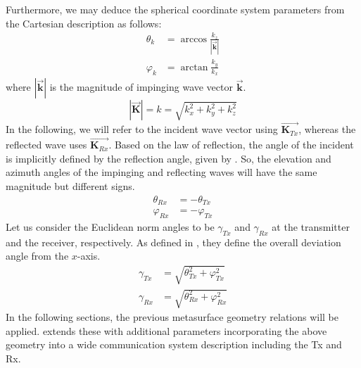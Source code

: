 Furthermore, we may deduce the spherical coordinate system parameters from the Cartesian description as follows:
\begin{equation} \label{Eq:theta_inc and varphi_inc}
	\begin{split}
		\theta_{k} &= \arccos{\frac{k_z}{|\overrightarrow{\textbf{k}}|}} \\
		\varphi_{k} &= \arctan{\frac{k_y}{k_x}} 
	\end{split}
\end{equation}
where $|\overrightarrow{\textbf{k}}|$ is the magnitude of impinging wave vector $\overrightarrow{\textbf{k}}$.
\begin{equation}
	|\overrightarrow{\textbf{K}}|= k= \sqrt{k_x^2+ k_y^2+ k_z^2}
\end{equation}
In the following, we will refer to the incident  wave vector using $\overrightarrow{\textbf{K}_{Tx}}$, whereas the reflected wave uses $\overrightarrow{\textbf{K}_{Rx}}$. Based on the law of reflection, the angle of the incident is implicitly defined by the reflection angle, given by . So, the elevation and azimuth angles of the impinging and reflecting waves will have the same magnitude but different signs.
\begin{equation} \label{Eq:law of reflection}
	\begin{split}
		\theta_{Rx} &= -\theta_{Tx}\\
		\varphi_{Rx} &=  -\varphi_{Tx}
	\end{split}
\end{equation}
Let us consider the Euclidean norm angles to be $\gamma_{Tx}$ and $\gamma_{Rx}$ at the transmitter and the receiver, respectively. As defined in  , they define the overall deviation angle from the $x$-axis.
\begin{equation} \label{Eq:euclidean norm}
	\begin{split}
		\gamma_{Tx} &= \sqrt{\theta_{Tx}^2+\varphi_{Tx}^2}\\
		\gamma_{Rx} &= \sqrt{\theta_{Rx}^2+\varphi_{Rx}^2}
	\end{split}
\end{equation}
In the following sections, the previous metasurface geometry relations will be applied.  extends these with additional parameters incorporating the above geometry into a wide communication system description including the Tx and Rx.
